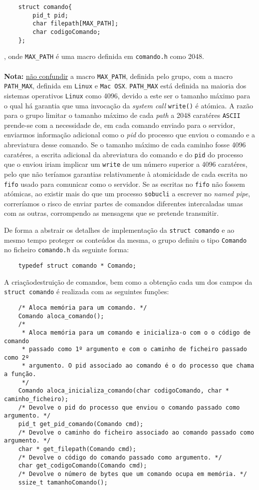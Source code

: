 \documentclass[a4paper,12pt,titlepage,portuguese]{article}
\begin{document}
	\begin{verbatim}
	struct comando{
		pid_t pid;
		char filepath[MAX_PATH];
		char codigoComando;
	};
	\end{verbatim}
, onde \texttt{MAX\_PATH} é uma macro definida em \texttt{comando.h} como 2048.
\\\\\textbf{Nota:} \underline{não confundir} a macro \texttt{MAX\_PATH}, definida pelo grupo, com a macro \texttt{PATH\_MAX}, definida em \texttt{Linux} e \texttt{Mac OSX}. \texttt{PATH\_MAX} está definida na maioria dos sistemas operativos \texttt{Linux} como 4096, devido a este ser o tamanho máximo para o qual há garantia que uma invocação da \emph{system call} \texttt{write()} é atómica. A razão para o grupo limitar o tamanho máximo de cada \emph{path} a 2048 caratéres \texttt{ASCII} prende-se com a necessidade de, em cada comando enviado para o servidor, enviarmos informação adicional como o \emph{pid} do processo que enviou o comando e a abreviatura desse comando. Se o tamanho máximo de cada caminho fosse 4096 caratéres, a escrita adicional da abreviatura do comando e do \texttt{pid} do processo que o enviou iriam implicar um \texttt{write} de um número superior a 4096 caratéres, pelo que não teríamos garantias relativamente à atomicidade de cada escrita no \texttt{fifo} usado para comunicar como o servidor. Se as escritas no \texttt{fifo} não fossem atómicas, ao existir mais do que um processo \texttt{sobucli} a escrever no \emph{named pipe}, correríamos o risco de enviar partes de comandos diferentes intercaladas umas com as outras, corrompendo as mensagens que se pretende transmitir.

De forma a abstrair os detalhes de implementação da \texttt{struct comando} e ao mesmo tempo proteger os conteúdos da mesma, o grupo definiu o tipo \texttt{Comando} no ficheiro \texttt{comando.h} da seguinte forma:

	\begin{verbatim}
	typedef struct comando * Comando;
	\end{verbatim}

A criação\/destruição de comandos, bem como a obtenção cada um dos campos da \texttt{struct comando} é realizada com as seguintes funções:

	\begin{verbatim}
	/* Aloca memória para um comando. */
	Comando aloca_comando();
	/* 
	 * Aloca memória para um comando e inicializa-o com o o código de comando
	 * passado como 1º argumento e com o caminho de ficheiro passado como 2º
	 * argumento. O pid associado ao comando é o do processo que chama a função.
	 */
	Comando aloca_inicializa_comando(char codigoComando, char * caminho_ficheiro);
	/* Devolve o pid do processo que enviou o comando passado como argumento. */
	pid_t get_pid_comando(Comando cmd);
	/* Devolve o caminho do ficheiro associado ao comando passado como argumento. */
	char * get_filepath(Comando cmd);
	/* Devolve o código do comando passado como argumento. */
	char get_codigoComando(Comando cmd);
	/* Devolve o número de bytes que um comando ocupa em memória. */
	ssize_t tamanhoComando();
	\end{verbatim}
\end{document}
